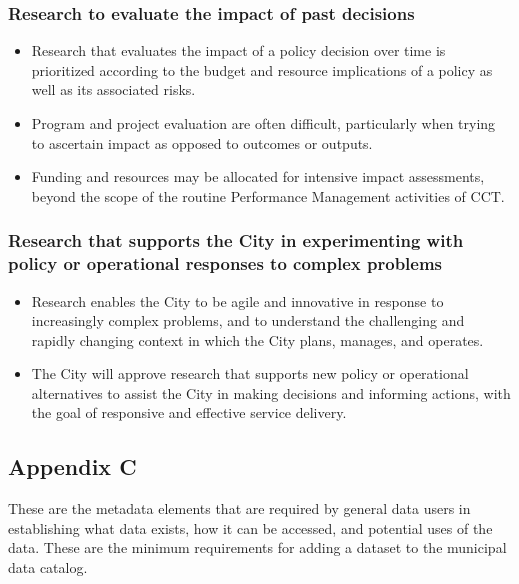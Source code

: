 \hypertarget{research-to-evaluate-the-impact-of-past-decisions}{%
\subsubsection*{Research to evaluate the impact of past decisions}\label{research-to-evaluate-the-impact-of-past-decisions}}

\begin{itemize}
\tightlist
\item
  Research that evaluates the impact of a policy decision over time is prioritized according to the budget and resource implications of a policy as well as its associated risks.
\item
  Program and project evaluation are often difficult, particularly when trying to ascertain impact as opposed to outcomes or outputs.
\item
  Funding and resources may be allocated for intensive impact assessments, beyond the scope of the routine Performance Management activities of CCT.
\end{itemize}

\hypertarget{research-that-supports-the-city-in-experimenting-with-policy-or-operational-responses-to-complex-problems}{%
\subsubsection*{Research that supports the City in experimenting with policy or operational responses to complex problems}\label{research-that-supports-the-city-in-experimenting-with-policy-or-operational-responses-to-complex-problems}}

\begin{itemize}
\tightlist
\item
  Research enables the City to be agile and innovative in response to increasingly complex problems, and to understand the challenging and rapidly changing context in which the City plans, manages, and operates.
\item
  The City will approve research that supports new policy or operational alternatives to assist the City in making decisions and informing actions, with the goal of responsive and effective service delivery.
\end{itemize}

\hypertarget{appendix-c}{%
\subsection*{Appendix C}\label{appendix-c}}

These are the metadata elements that are required by general data users in establishing what data exists, how it can be accessed, and potential uses of the data. These are the minimum requirements for adding a dataset to the municipal data catalog.



